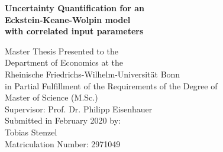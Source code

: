 \begin{titlepage}
	
\begin{center}
	
\vspace*{1.0cm}

{\LARGE
\bfseries Uncertainty Quantification for an \\
\vspace*{0.5cm}
Eckstein-Keane-Wolpin model
}
\\
\vspace*{0.5cm}
{\LARGE
\bfseries with correlated input parameters
}

{\large
\vspace*{4.0cm}
Master Thesis Presented to the\\
\vspace*{0.25cm}
Department of Economics at the\\
\vspace*{0.25cm}
Rheinische Friedrichs-Wilhelm-Universität Bonn\\

\vspace*{2.0cm}
in Partial Fulfillment of the Requirements of the Degree of\\
\vspace*{0.25cm}
Master of Science (M.Sc.)\\

\vspace*{4.0cm}
Supervisor: Prof. Dr. Philipp Eisenhauer\\

\vspace*{2.0cm}
Submitted in February 2020 by:\\
Tobias Stenzel\\
Matriculation Number: 2971049
}

\end{center}

\end{titlepage}
